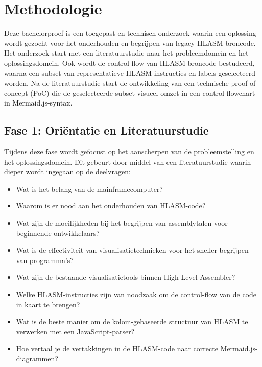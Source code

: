 

\section{Methodologie}%
\label{sec:methodologie}

Deze bachelorproef is een toegepast en technisch onderzoek waarin een oplossing wordt gezocht voor het onderhouden en begrijpen van legacy HLASM-broncode. Het onderzoek start met een literatuurstudie naar het probleemdomein en het oplossingsdomein. Ook wordt de control flow van HLASM-broncode bestudeerd, waarna een subset van representatieve HLASM-instructies en labels geselecteerd worden. Na de literatuurstudie start de ontwikkeling van een technische proof-of-concept (PoC) die de geselecteerde subset visueel omzet in een control-flowchart in Mermaid.js-syntax.

\subsection{Fase 1: Oriëntatie en Literatuurstudie}

Tijdens deze fase wordt gefocust op het aanscherpen van de probleemstelling en het oplossingsdomein. Dit gebeurt door middel van een literatuurstudie waarin dieper wordt ingegaan op de deelvragen:

\begin{itemize}
    \item Wat is het belang van de mainframecomputer?
    \item Waarom is er nood aan het onderhouden van HLASM-code?
    \item Wat zijn de moeilijkheden bij het begrijpen van assemblytalen voor beginnende ontwikkelaars?
    \item Wat is de effectiviteit van visualisatietechnieken voor het sneller begrijpen van programma's?
    \item Wat zijn de bestaande visualisatietools binnen High Level Assembler?
    \item Welke HLASM-instructies zijn van noodzaak om de control-flow van de code in kaart te brengen?
    \item Wat is de beste manier om de kolom-gebaseerde structuur van HLASM te verwerken met een JavaScript-parser?
    \item Hoe vertaal je de vertakkingen in de HLASM-code naar correcte Mermaid.js-diagrammen?
\end{itemize}


